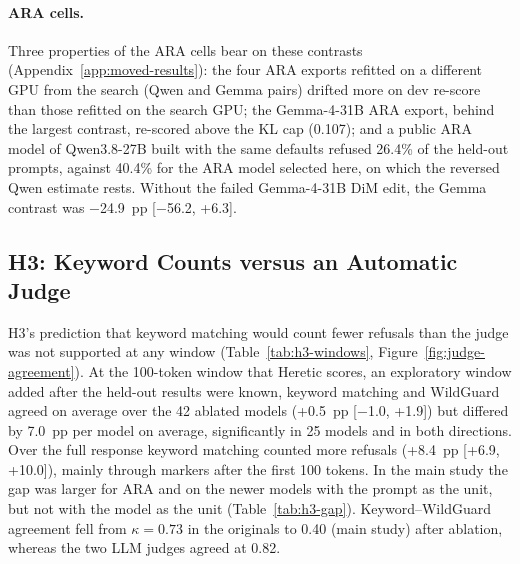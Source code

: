 \paragraph{ARA cells.} Three properties of the ARA cells bear on these
contrasts (Appendix~\ref{app:moved-results}): the four ARA exports refitted on
a different GPU from the search (Qwen and Gemma pairs) drifted more on dev
re-score than those refitted on the search GPU; the Gemma-4-31B ARA export,
behind the largest contrast, re-scored above the KL cap (0.107); and a public
ARA model of Qwen3.8-27B built with the same defaults refused 26.4\% of the
held-out prompts, against 40.4\% for the ARA model selected here, on which the
reversed Qwen estimate rests. Without the failed Gemma-4-31B DiM edit, the Gemma
contrast was $-$24.9~pp [$-$56.2, +6.3].



\subsection{H3: Keyword Counts versus an Automatic Judge}
\label{sec:res-h3}

H3's prediction that keyword matching would count fewer refusals than the
judge was not supported at any window (Table~\ref{tab:h3-windows},
Figure~\ref{fig:judge-agreement}). At the 100-token window that Heretic scores,
an exploratory window added after the held-out results were known, keyword
matching and WildGuard agreed on average over the 42 ablated models (+0.5~pp
[$-$1.0, +1.9]) but differed by 7.0~pp per model on average, significantly in
25 models and in both directions. Over the full response keyword matching
counted more refusals (+8.4~pp [+6.9, +10.0]), mainly through markers after
the first 100 tokens. In the main study the gap was larger for ARA and on the
newer models with the prompt as the unit, but not with the model as the unit
(Table~\ref{tab:h3-gap}). Keyword--WildGuard agreement fell from
$\kappa=0.73$ in the originals to 0.40 (main study) after ablation, whereas
the two LLM judges agreed at 0.82.

